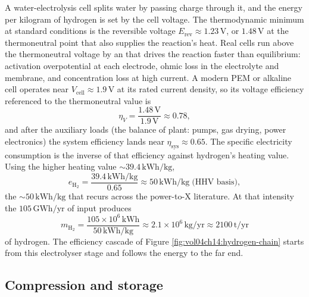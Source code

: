 A water-electrolysis cell splits water by passing charge through it, and
the energy per kilogram of hydrogen is set by the cell voltage. The
thermodynamic minimum at standard conditions is the reversible voltage
$E_{\text{rev}} \approx 1.23\,\si{\volt}$, or $1.48\,\si{\volt}$ at the
thermoneutral point that also supplies the reaction's heat. Real cells run
above the thermoneutral voltage by an  that drives
the reaction faster than equilibrium: activation overpotential at each
electrode, ohmic loss in the electrolyte and membrane, and concentration
loss at high current. A modern PEM or alkaline cell operates near
$V_{\text{cell}}\approx 1.9\,\si{\volt}$ at its rated current density, so
its voltage efficiency referenced to the thermoneutral value is
\[
\eta_V = \frac{1.48\,\si{\volt}}{1.9\,\si{\volt}} \approx 0.78,
\]
and after the auxiliary loads (the balance of plant: pumps, gas drying,
power electronics) the system efficiency lands near $\eta_{\text{sys}}
\approx 0.65$. The specific electricity consumption is the inverse of that
efficiency against hydrogen's heating value. Using the higher heating value
$\sim 39.4\,\si{\kilo\watt\hour\per\kilogram}$,
\[
e_{\text{H}_2} = \frac{39.4\,\si{\kilo\watt\hour\per\kilogram}}{0.65}
\approx 50\,\si{\kilo\watt\hour\per\kilogram} \;\text{(HHV basis)},
\]
the $\sim 50\,\si{\kilo\watt\hour}/\si{\kilogram}$ that recurs across the
power-to-X literature. At that intensity the $105\,\si{\giga\watt\hour}/
\text{yr}$ of input produces
\[
m_{\text{H}_2} = \frac{105\times 10^6\,\si{\kilo\watt\hour}}
{50\,\si{\kilo\watt\hour\per\kilogram}} \approx 2.1\times 10^6\,\si{\kilogram}
/\text{yr} \approx 2100\,\text{t}/\text{yr}
\]
of hydrogen. The efficiency cascade of Figure
\ref{fig:vol04ch14:hydrogen-chain} starts from this electrolyser stage and
follows the energy to the far end.



\subsection{Compression and storage}

